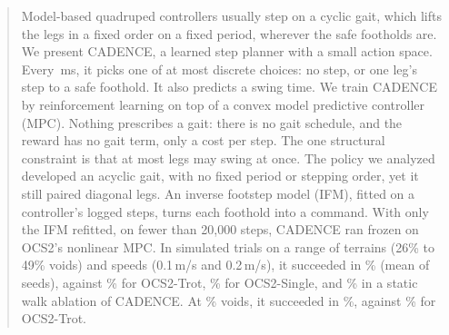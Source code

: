 \documentclass{l4dc2027}
\begin{document}
\begin{abstract}%
  Model-based quadruped controllers usually step on a cyclic gait, which
  lifts the legs in a fixed order on a fixed period, wherever the safe
  footholds are. We present CADENCE, a learned step planner with a small
  action space. Every \corlControlTickMs\,ms, it picks one of at most
  \corlTotalCandidates{} discrete choices: no step, or one leg's step to
  a safe foothold. It also predicts a swing time. 
  We train CADENCE by reinforcement learning on top of a convex model
  predictive controller (MPC). Nothing prescribes a gait: there is no
  gait schedule, and the reward has no gait term, only a cost per step.
  The one structural constraint is that at most
  \numberstringnum{\corlMaxConcurrentSwingLegs} legs may swing at once.
  The policy we analyzed developed an acyclic gait, with no fixed period
  or stepping order, yet it still paired diagonal legs. An
  inverse footstep model (IFM), fitted on a controller's logged steps,
  turns each foothold into a command. With only the IFM refitted, on
  fewer than 20{,}000 steps, CADENCE ran frozen on OCS2's
  nonlinear MPC. In simulated trials on a range of terrains (26\% to 49\% voids) and speeds (0.1\,m/s and 0.2\,m/s), it succeeded
  in \corlBenchFull\% (mean of \corlNumSeedsGaitNet{} seeds),
  against \corlBenchTrot\% for OCS2-Trot,
  \corlBenchStaticWalk\% for OCS2-Single, and \corlBenchSingle\% in a static walk ablation of CADENCE. At \corlBenchVoidHigh\% voids, it
  succeeded in \corlBenchFullDense\%, against \corlBenchTrotDense\% for
  OCS2-Trot. %
  
\end{abstract}
\end{document}
